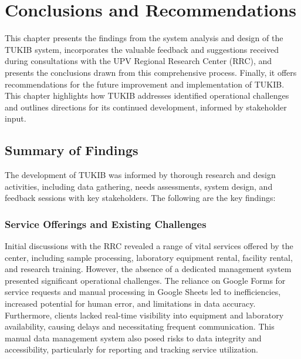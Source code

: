 \chapter{Conclusions and Recommendations}
This chapter presents the findings from the system analysis and design of the TUKIB system, incorporates the valuable feedback and suggestions received during consultations with the UPV Regional Research Center (RRC), and presents the conclusions drawn from this comprehensive process. Finally, it offers recommendations for the future improvement and implementation of TUKIB. This chapter highlights how TUKIB addresses identified operational challenges and outlines directions for its continued development, informed by stakeholder input.

\section{Summary of Findings}
The development of TUKIB was informed by thorough research and design activities, including data gathering, needs assessments, system design, and feedback sessions with key stakeholders. The following are the key findings:

\subsection{Service Offerings and Existing Challenges}
Initial discussions with the RRC revealed a range of vital services offered by the center, including sample processing, laboratory equipment rental, facility rental, and research training. However, the absence of a dedicated management system presented significant operational challenges. The reliance on Google Forms for service requests and manual processing in Google Sheets led to inefficiencies, increased potential for human error, and limitations in data accuracy. Furthermore, clients lacked real-time visibility into equipment and laboratory availability, causing delays and necessitating frequent communication. This manual data management system also posed risks to data integrity and accessibility, particularly for reporting and tracking service utilization.

